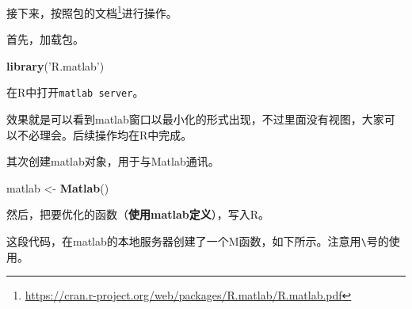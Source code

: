 \documentclass[]{ctexbook}
\newenvironment{Shaded}{\begin{snugshade}}{\end{snugshade}}
\newcommand{\KeywordTok}[1]{\textcolor[rgb]{0.13,0.29,0.53}{\textbf{#1}}}
\newcommand{\FloatTok}[1]{\textcolor[rgb]{0.00,0.00,0.81}{#1}}
\newcommand{\StringTok}[1]{\textcolor[rgb]{0.31,0.60,0.02}{#1}}
\newcommand{\CommentTok}[1]{\textcolor[rgb]{0.56,0.35,0.01}{\textit{#1}}}
\newcommand{\OperatorTok}[1]{\textcolor[rgb]{0.81,0.36,0.00}{\textbf{#1}}}
\newcommand{\NormalTok}[1]{#1}
\renewcommand{\href}[2]{#2\footnote{\url{#1}}}
\theoremstyle{definition}
\theoremstyle{definition}
\theoremstyle{definition}
\theoremstyle{remark}
\begin{document}
接下来，按照\href{https://cran.r-project.org/web/packages/R.matlab/R.matlab.pdf}{包的文档}进行操作。

首先，加载包。

\begin{Shaded}
\begin{Highlighting}[]
\KeywordTok{library}\NormalTok{(}\StringTok{'R.matlab'}\NormalTok{)}
\end{Highlighting}
\end{Shaded}

在R中打开\texttt{matlab\ server}。

\begin{Shaded}
\end{Shaded}

效果就是可以看到matlab窗口以最小化的形式出现，不过里面没有视图，大家可以不必理会。后续操作均在R中完成。

其次创建matlab对象，用于与Matlab通讯。

\begin{Shaded}
\begin{Highlighting}[]
\NormalTok{matlab <-}\StringTok{ }\KeywordTok{Matlab}\NormalTok{()}
\end{Highlighting}
\end{Shaded}

然后，把要优化的函数（\textbf{使用matlab定义}），写入R。

\begin{Shaded}
\end{Shaded}

这段代码，在matlab的本地服务器创建了一个M函数，如下所示。注意用\texttt{\textbackslash{}}号的使用。

\begin{Shaded}
\end{Shaded}
\end{document}
